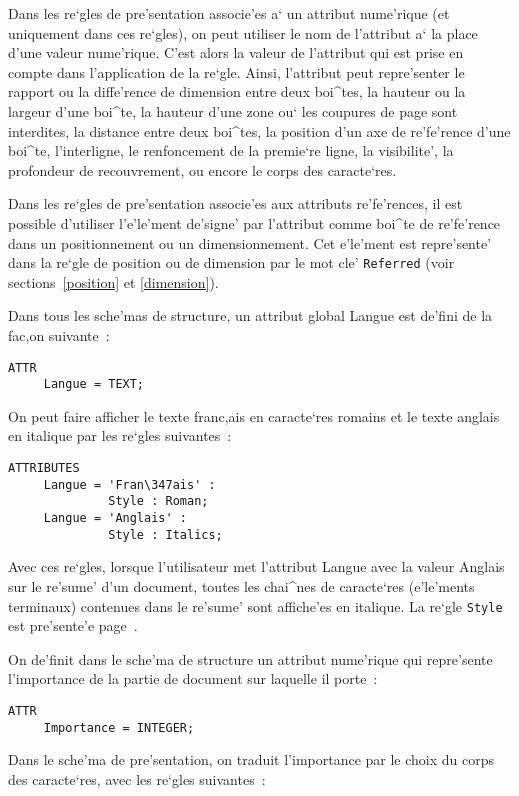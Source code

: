 {Dans les re`gles de pre'sentation associe'es a` un attribut nume'rique (et
uniquement dans ces re`gles), on peut utiliser le nom de l'attribut a` la
place d'une valeur nume'rique. C'est alors la valeur de l'attribut qui est
prise en compte dans l'application de la re`gle. Ainsi, l'attribut peut
repre'senter le rapport ou la diffe'rence de dimension entre deux boi^tes,
la hauteur ou la largeur d'une boi^te, la hauteur d'une zone ou` les
coupures de page sont interdites, la distance entre deux boi^tes,
la position d'un axe de re'fe'rence d'une boi^te, l'interligne, le renfoncement
de la premie`re ligne, la visibilite', la profondeur de recouvrement, ou encore
le corps des caracte`res.

Dans les re`gles de pre'sentation associe'es aux attributs re'fe'rences, il
est possible d'utiliser l'e'le'ment de'signe' par l'attribut comme boi^te de
re'fe'rence dans un positionnement ou un dimensionnement. Cet e'le'ment est
repre'sente' dans la re`gle de position ou de dimension par le mot cle'
{\tt Referred} (voir sections~\ref{position} et \ref{dimension}).

\begin{example}
Dans tous les sche'mas de structure, un attribut global Langue est de'fini
de la fac,on suivante~:

\begin{verbatim}
ATTR
     Langue = TEXT;
\end{verbatim}
On peut faire afficher le texte franc,ais en caracte`res romains et le texte
anglais en italique par les re`gles suivantes~:

\begin{verbatim}
ATTRIBUTES
     Langue = 'Fran\347ais' :
              Style : Roman;
     Langue = 'Anglais' :
              Style : Italics;
\end{verbatim}
Avec ces re`gles, lorsque l'utilisateur met l'attribut Langue avec la valeur
Anglais sur le re'sume' d'un document, toutes les chai^nes de caracte`res
(e'le'ments terminaux) contenues dans le re'sume' sont affiche'es en italique.
La re`gle {\tt Style} est pre'sente'e page~\pageref{style}.
\end{example}

\begin{example}
On de'finit dans le sche'ma de structure un attribut nume'rique qui repre'sente
l'importance de la partie de document sur laquelle il porte~:
\begin{verbatim}
ATTR
     Importance = INTEGER;
\end{verbatim}
Dans le sche'ma de pre'sentation, on traduit l'importance par le choix du corps
des caracte`res, avec les re`gles suivantes~:


\end{example}}
